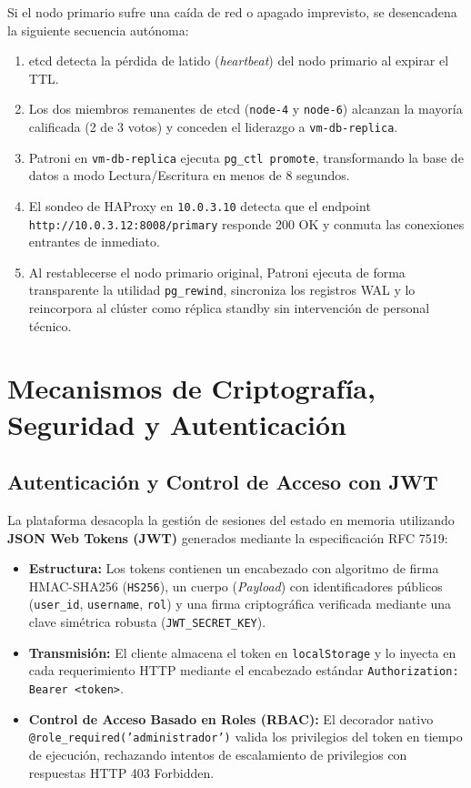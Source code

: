 \documentclass[12pt]{article}
\begin{document}
Si el nodo primario sufre una caída de red o apagado imprevisto, se desencadena la siguiente secuencia autónoma:
\begin{enumerate}
    \item etcd detecta la pérdida de latido (\textit{heartbeat}) del nodo primario al expirar el TTL.
    \item Los dos miembros remanentes de etcd (\texttt{node-4} y \texttt{node-6}) alcanzan la mayoría calificada (2 de 3 votos) y conceden el liderazgo a \texttt{vm-db-replica}.
    \item Patroni en \texttt{vm-db-replica} ejecuta \texttt{pg\_ctl promote}, transformando la base de datos a modo Lectura/Escritura en menos de 8 segundos.
    \item El sondeo de HAProxy en \texttt{10.0.3.10} detecta que el endpoint \texttt{http://10.0.3.12:8008/primary} responde 200 OK y conmuta las conexiones entrantes de inmediato.
    \item Al restablecerse el nodo primario original, Patroni ejecuta de forma transparente la utilidad \texttt{pg\_rewind}, sincroniza los registros WAL y lo reincorpora al clúster como réplica standby sin intervención de personal técnico.
\end{enumerate}


\section{Mecanismos de Criptografía, Seguridad y Autenticación}

\subsection{Autenticación y Control de Acceso con JWT}
La plataforma desacopla la gestión de sesiones del estado en memoria utilizando \textbf{JSON Web Tokens (JWT)} generados mediante la especificación RFC 7519:
\begin{itemize}
    \item \textbf{Estructura:} Los tokens contienen un encabezado con algoritmo de firma HMAC-SHA256 (\texttt{HS256}), un cuerpo (\textit{Payload}) con identificadores públicos (\texttt{user\_id}, \texttt{username}, \texttt{rol}) y una firma criptográfica verificada mediante una clave simétrica robusta (\texttt{JWT\_SECRET\_KEY}).
    \item \textbf{Transmisión:} El cliente almacena el token en \texttt{localStorage} y lo inyecta en cada requerimiento HTTP mediante el encabezado estándar \texttt{Authorization: Bearer <token>}.
    \item \textbf{Control de Acceso Basado en Roles (RBAC):} El decorador nativo \texttt{@role\_required('administrador')} valida los privilegios del token en tiempo de ejecución, rechazando intentos de escalamiento de privilegios con respuestas HTTP 403 Forbidden.
\end{itemize}
\end{document}
